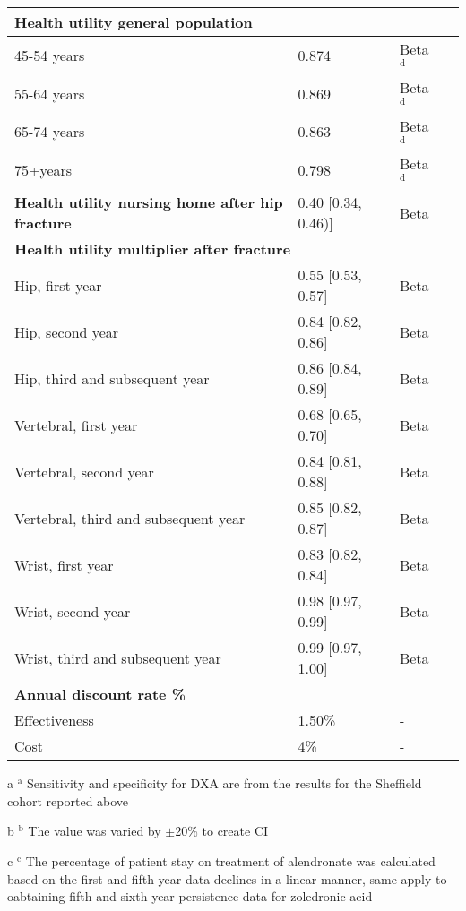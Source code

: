 \begin{center}
{\begin{longtable}{m{5.3cm}lll}
\midrule
\multicolumn{4}{l}{{\bf Health utility general population}}\\
\midrule
45-54 years & 0.874 & Beta $^{\mathrm{d}}$ & \cite{4-72}\\
55-64 years & 0.869 & Beta $^{\mathrm{d}}$ & \cite{4-72}\\
65-74 years & 0.863 & Beta $^{\mathrm{d}}$ & \cite{4-72}\\
75+years & 0.798 & Beta $^{\mathrm{d}}$ & \cite{4-72}\\
\midrule
{\bf Health utility nursing home after hip fracture} & 0.40 [0.34, 0.46)] & Beta & \cite{4-74}\\
\midrule
\multicolumn{4}{l}{{\bf Health utility multiplier after fracture}}\\ 
\midrule
Hip, first year & 0.55 [0.53, 0.57] & Beta & \cite{4-73}\\
Hip, second year & 0.84 [0.82, 0.86] & Beta & \cite{4-73}\\
Hip, third and subsequent year & 0.86 [0.84, 0.89] & Beta & \cite{4-73}\\
Vertebral, first year & 0.68 [0.65, 0.70] & Beta & \cite{4-73}\\
Vertebral, second year & 0.84 [0.81, 0.88] & Beta & \cite{4-73}\\
Vertebral, third and subsequent year & 0.85 [0.82, 0.87] & Beta & \cite{4-73}\\
Wrist, first year & 0.83 [0.82, 0.84] & Beta & \cite{4-73}\\
Wrist, second year & 0.98 [0.97, 0.99] & Beta & \cite{4-73}\\
Wrist, third and subsequent year & 0.99 [0.97, 1.00] & Beta & \cite{4-73}\\
\midrule
\multicolumn{4}{l}{{\bf Annual discount rate \%}}\\
\midrule
Effectiveness & 1.50\% & - & \cite{4-14}\\
Cost & 4\% & - & \cite{4-14}\\
\bottomrule
\end{longtable}}
\begin{tablenotes}
\footnotesize
\item[a]$^{\mathrm{a}}$ Sensitivity and specificity for DXA are from the results for the Sheffield cohort reported above
\item[b]$^{\mathrm{b}}$ The value was varied by $\pm$20\% to create CI
\item[c]$^{\mathrm{c}}$ The percentage of patient stay on treatment of alendronate was calculated based on the first and fifth year data declines in a linear manner, same apply to oabtaining fifth and sixth year persistence data for zoledronic acid

\end{tablenotes}
\end{center}
